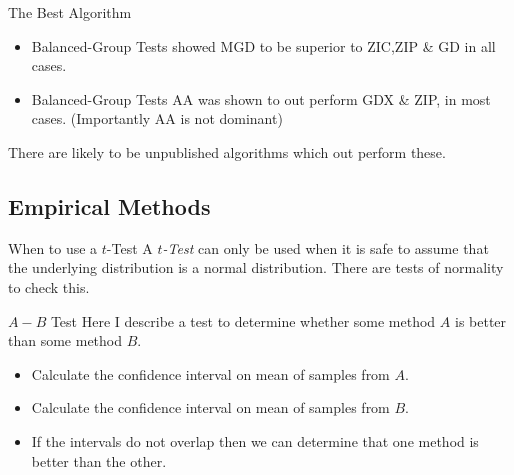 \documentclass[11pt,a4paper]{article}
\begin{document}
  \begin{remark}{The Best Algorithm}
    \begin{itemize}
      \item Balanced-Group Tests showed MGD to be superior to ZIC,ZIP \& GD in all cases.
      \item Balanced-Group Tests AA was shown to out perform GDX \& ZIP, in most cases. (Importantly AA is not dominant)
    \end{itemize}
    There are likely to be unpublished algorithms which out perform these.
  \end{remark}

\subsection{Empirical Methods}

  \begin{remark}{When to use a $t$-Test}
    A \textit{$t$-Test} can only be used when it is safe to assume that the underlying distribution is a normal distribution. There are tests of normality to check this.
  \end{remark}

  \begin{proposition}{$A-B$ Test}
    Here I describe a test to determine whether some method $A$ is better than some method $B$.
    \begin{itemize}
      \item Calculate the confidence interval on mean of samples from $A$.
      \item Calculate the confidence interval on mean of samples from $B$.
      \item If the intervals do not overlap then we can determine that one method is better than the other.
    \end{itemize}
  \end{proposition}
\end{document}

